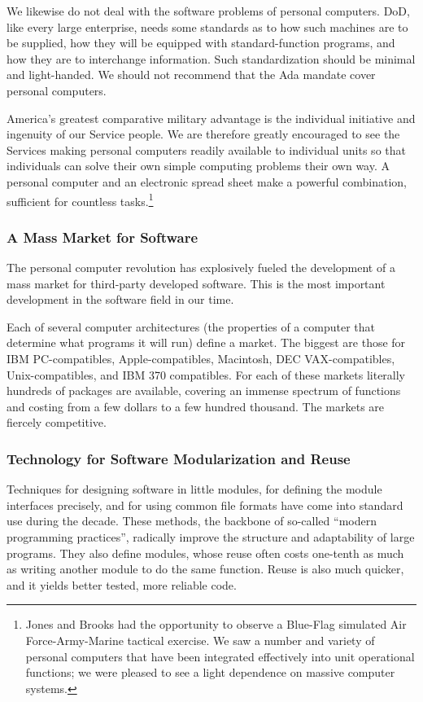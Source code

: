 \documentclass[11pt,final]{article}
\begin{document}
We likewise do not deal with the software problems of personal computers. DoD,
like every large enterprise, needs some standards as to how such machines are
to be supplied, how they will be equipped with standard-function programs, and
how they are to interchange information. Such standardization should be
minimal and light-handed. We should not recommend that the Ada mandate cover
personal computers. %

America’s greatest comparative military advantage is the individual initiative
and ingenuity of our Service people. We are therefore greatly encouraged to see
the Services making personal computers readily available to individual units so
that individuals can solve their own simple computing problems their own way. A
personal computer and an electronic spread sheet make a powerful combination,
sufficient for countless tasks.\footnote{Jones and Brooks had the opportunity
to observe a Blue-Flag simulated Air Force-Army-Marine tactical exercise. We
saw a number and variety of personal computers that have been integrated
effectively into unit operational functions; we were pleased to see a light
dependence on massive computer systems.}

\subsubsection*{A Mass Market for Software}

The personal computer revolution has explosively fueled the development of a
mass market for third-party developed software. This is the most important
development in the software field in our time.

Each of several computer architectures (the properties of a computer that
determine what programs it will run) define a market. The biggest are those for
IBM PC-compatibles, Apple-compatibles, Macintosh, DEC VAX-compatibles,
Unix-compatibles, and IBM 370 compatibles. For each of these markets literally
hundreds of packages are available, covering an immense spectrum of functions
and costing from a few dollars to a few hundred thousand. The markets are
fiercely competitive.

\subsubsection*{Technology for Software Modularization and Reuse}

Techniques for designing software in little modules, for defining the module
interfaces precisely, and for using common file formats have come into standard
use during the decade. These methods, the backbone of so-called “modern
programming practices”, radically improve the structure and adaptability of
large programs. They also define modules, whose reuse often costs one-tenth as
much as writing another module to do the same function. Reuse is also much
quicker, and it yields better tested, more reliable code.
\end{document}
